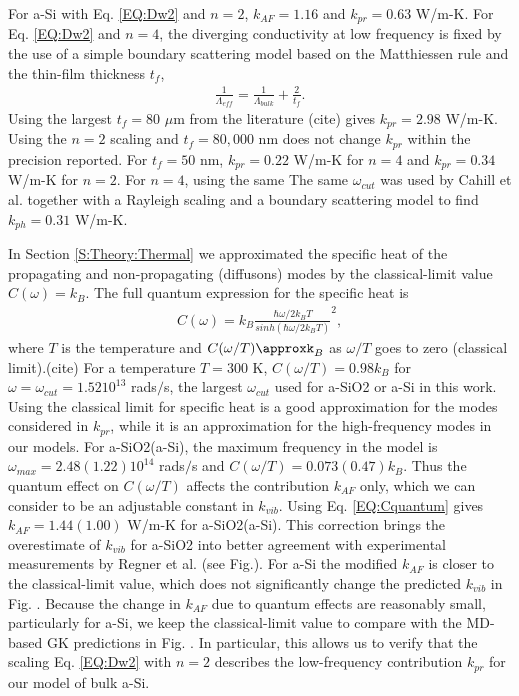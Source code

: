 \documentclass[aps,prb,onecolumn,preprint,superscriptaddress,footinbib,amsmath,amssymb,floatfix]{revtex4}
\begin{document}
For a-Si with Eq. \eqref{EQ:Dw2} and $n=2$, 
$k_{AF} = 1.16$ and $k_{pr} = 0.63$ W/m-K. For Eq. \eqref{EQ:Dw2} 
and $n=4$, the 
diverging conductivity at low frequency is fixed by the 
use of a simple boundary scattering model based on the Matthiessen 
rule and the thin-film thickness $t_f$,\cite{sellan_cross-plane_2010} 
\begin{equation}\label{EQ:LambdaMatth}
\begin{split}
\frac{1}{\Lambda_{eff}} = \frac{1}{\Lambda_{bulk}} + 
\frac{2}{t_f}.
\end{split}
\end{equation}
Using the largest $t_f = 80$ $\mu$m from the literature
(cite) gives $k_{pr} = 2.98$ W/m-K. 
Using the $n=2$ scaling and $t_f = 80,000$ nm does not change 
$k_{pr}$ within the precision reported. For $t_f = 50$ nm, 
$k_{pr} = 0.22$ W/m-K for $n=4$ 
and $k_{pr} = 0.34$ W/m-K for $n=2$. For $n=4$, using the 
same 
The same $\omega_{cut}$ was used by Cahill et al. 
together with a Rayleigh scaling and a boundary scattering model to 
find $k_{ph} = 0.31$ W/m-K.\cite{cahill_thermal_1994} 

In Section \ref{S:Theory:Thermal} we approximated the specific heat 
of the propagating 
and non-propagating (diffusons) modes by the classical-limit 
value $C(\omega) = k_{B}$.    
The full quantum expression for the specific heat is
\begin{equation}\label{EQ:Cquantum}
\begin{split}
C(\omega) = k_{B}\frac{\hbar\omega/2k_{B}T}{sinh(\hbar\omega/2k_{B}T)}^2,
\end{split}
\end{equation}
where $T$ is the temperature and $C(\omega/T)\approxk_{B}$ as $\omega/T$ 
goes to zero (classical limit).(cite) 
For a temperature $T=300$ K, $C(\omega/T) = 0.98 k_{B}$ 
for $\omega = \omega_{cut} = 1.52 10^{13}$ rads$/$s, the largest 
$\omega_{cut}$ used for a-SiO2 or a-Si in this work. Using the 
classical limit for specific heat is a good approximation for the 
modes considered in $k_{pr}$, while it is an approximation for the 
high-frequency modes in our models. For a-SiO2(a-Si), the maximum 
frequency in the model is 
$\omega_{max} = 2.48 (1.22) 10^{14}$ rads$/$s and 
$C(\omega/T) = 0.073 (0.47) k_{B}$. Thus the quantum effect on 
$C(\omega/T)$ affects the 
contribution $k_{AF}$ only, which we can consider to be an 
adjustable constant in $k_{vib}$. Using Eq. \eqref{EQ:Cquantum} gives 
$k_{AF} = 1.44 (1.00) $ W/m-K   
for a-SiO2(a-Si). This correction brings 
the overestimate of $k_{vib}$ for a-SiO2 into better 
agreement with experimental measurements by Regner et al. (see Fig.). 
For a-Si the modified $k_{AF}$ is closer to the classical-limit value, 
which does not significantly change the predicted $k_{vib}$ in Fig. . 
Because the change in $k_{AF}$ due to quantum effects are reasonably 
small, particularly for a-Si, 
we keep the classical-limit value to compare with the MD-based 
GK predictions in Fig. .  In particular, this allows us to verify that 
the scaling Eq. \eqref{EQ:Dw2} with $n=2$ describes the low-frequency 
contribution $k_{pr}$ for our model of bulk a-Si. 
\end{document}
